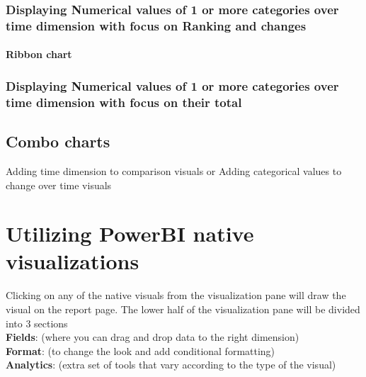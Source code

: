\documentclass[
]{book}
\begin{document}
\hypertarget{displaying-numerical-values-of-1-or-more-categories-over-time-dimension-with-focus-on-ranking-and-changes}{%
\subsection{Displaying Numerical values of 1 or more categories over time dimension with focus on Ranking and changes}\label{displaying-numerical-values-of-1-or-more-categories-over-time-dimension-with-focus-on-ranking-and-changes}}

\hypertarget{ribbon-chart}{%
\subsubsection{Ribbon chart}\label{ribbon-chart}}

\hypertarget{displaying-numerical-values-of-1-or-more-categories-over-time-dimension-with-focus-on-their-total}{%
\subsection{Displaying Numerical values of 1 or more categories over time dimension with focus on their total}\label{displaying-numerical-values-of-1-or-more-categories-over-time-dimension-with-focus-on-their-total}}

\hypertarget{combo-charts}{%
\section{Combo charts}\label{combo-charts}}

Adding time dimension to comparison visuals or Adding categorical values to change over time visuals

\hypertarget{utilizing-powerbi-native-visualizations}{%
\chapter{Utilizing PowerBI native visualizations}\label{utilizing-powerbi-native-visualizations}}

Clicking on any of the native visuals from the visualization pane will draw the visual on the report page.
The lower half of the visualization pane will be divided into 3 sections\\
\textbf{Fields}: (where you can drag and drop data to the right dimension)\\
\textbf{Format}: (to change the look and add conditional formatting)\\
\textbf{Analytics}: (extra set of tools that vary according to the type of the visual)
\end{document}
